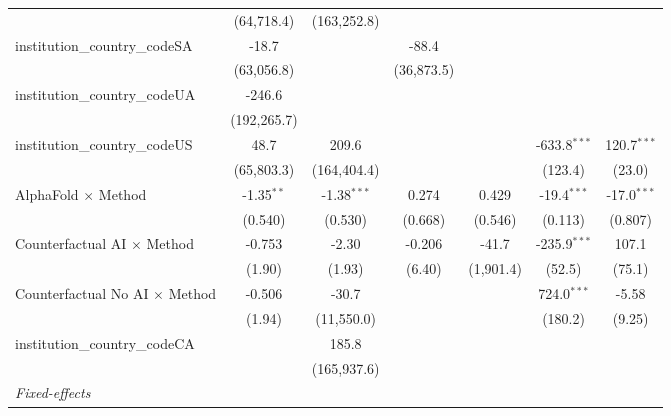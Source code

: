 \begin{tabular}{lcccccc}
                                         & (64,718.4)   & (163,252.8)   &             &               &                &   \\   
   institution\_country\_codeSA          & -18.7        &               & -88.4       &               &                &   \\   
                                         & (63,056.8)   &               & (36,873.5)  &               &                &   \\   
   institution\_country\_codeUA          & -246.6       &               &             &               &                &   \\   
                                         & (192,265.7)  &               &             &               &                &   \\   
   institution\_country\_codeUS          & 48.7         & 209.6         &             &               & -633.8$^{***}$ & 120.7$^{***}$\\   
                                         & (65,803.3)   & (164,404.4)   &             &               & (123.4)        & (23.0)\\   
   AlphaFold $\times$ Method             & -1.35$^{**}$ & -1.38$^{***}$ & 0.274       & 0.429         & -19.4$^{***}$  & -17.0$^{***}$\\   
                                         & (0.540)      & (0.530)       & (0.668)     & (0.546)       & (0.113)        & (0.807)\\   
   Counterfactual AI $\times$ Method     & -0.753       & -2.30         & -0.206      & -41.7         & -235.9$^{***}$ & 107.1\\   
                                         & (1.90)       & (1.93)        & (6.40)      & (1,901.4)     & (52.5)         & (75.1)\\   
   Counterfactual No AI $\times$ Method  & -0.506       & -30.7         &             &               & 724.0$^{***}$  & -5.58\\   
                                         & (1.94)       & (11,550.0)    &             &               & (180.2)        & (9.25)\\   
   institution\_country\_codeCA          &              & 185.8         &             &               &                &   \\   
                                         &              & (165,937.6)   &             &               &                &   \\   
   \midrule
   \emph{Fixed-effects}\\

\end{tabular}
